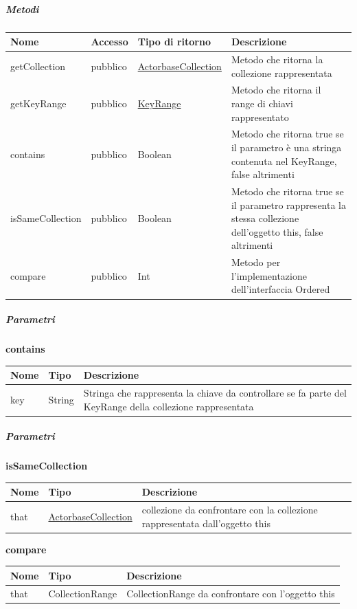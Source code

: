 \documentclass{scalatekids-article}
\begin{document}
\subparagraph{Metodi}
\begin{tabular}{| l | l | l | l |}
  \hline
  Nome & Accesso & Tipo di ritorno & Descrizione\\
  \hline
  getCollection & pubblico & \hyperref[sec:actorbase::actorsystem::utils::ActorbaseCollection]{ActorbaseCollection} & Metodo che ritorna la collezione rappresentata \\
  \hline
  getKeyRange & pubblico & \hyperref[sec:actorbase::actorsystem::utils::KeyRange]{KeyRange} & Metodo che ritorna il range di chiavi rappresentato \\
  \hline
  contains & pubblico & Boolean & Metodo che ritorna true se il parametro è una stringa contenuta nel KeyRange, false altrimenti\\
  \hline
  isSameCollection & pubblico & Boolean & Metodo che ritorna true se il parametro rappresenta la stessa collezione dell'oggetto this, false altrimenti \\
  \hline
  compare & pubblico & Int & Metodo per l'implementazione dell'interfaccia Ordered \\
  \hline
\end{tabular}

\subparagraph{Parametri}
\begin{center}
  \textbf{contains}\\
\end{center}
\begin{tabular}{| l | l | l |}
  \hline
  Nome & Tipo & Descrizione\\
  \hline
  key & String & Stringa che rappresenta la chiave da controllare se fa parte del KeyRange della collezione rappresentata \\
  \hline
\end{tabular}

\subparagraph{Parametri}
\begin{center}
  \textbf{isSameCollection}\\
\end{center}
\begin{tabular}{| l | l | l |}
  \hline
  Nome & Tipo & Descrizione\\
  \hline
  that & \hyperref[sec:actorbase::actorsystem::utils::ActorbaseCollection]{ActorbaseCollection} & collezione da confrontare con la collezione rappresentata dall'oggetto this \\
  \hline
\end{tabular}

\begin{center}
  \textbf{compare}\\
\end{center}
\begin{tabular}{| l | l | l |}
  \hline
  Nome & Tipo & Descrizione\\
  \hline
  that & CollectionRange & CollectionRange da confrontare con l'oggetto this \\
  \hline
\end{tabular}
\end{document}
